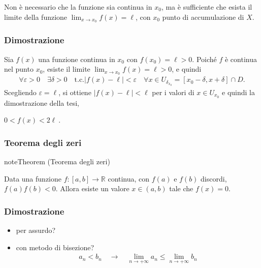\documentclass[letterpaper,10pt,italian]{jupyterBook}
\begin{document}
\sphinxAtStartPar
{} Non è necessario che la funzione sia continua in \(x_0\), ma è sufficiente che esista il limite della funzione \(\lim_{x \rightarrow x_0} f(x) = \ell\), con \(x_0\) punto di accumulazione di \(X\).
\subsubsection*{Dimostrazione}

\sphinxAtStartPar
Sia \(f(x)\) una funzione continua in \(x_0\) con \(f(x_0) = \ell > 0\). Poiché \(f\) è continua nel punto \(x_0\), esiste il limite \(\lim_{x \rightarrow x_0} f(x) = \ell > 0\), e quindi
\begin{equation*}
\begin{split}\forall \varepsilon > 0 \quad \exists \delta > 0 \quad \text{t.c.} |f(x) - \ell| < \varepsilon \quad \forall x \in U_{\delta_{x_0}} = [ x_0 - \delta, x + \delta] \cap D . \end{split}
\end{equation*}
\sphinxAtStartPar
Scegliendo \(\varepsilon = \ell\), si ottiene \(|f(x) - \ell| < \ell\) per i valori di \(x \in U_{x_0}\) e quindi la dimostrazione della tesi,

\sphinxAtStartPar
\(0 < f(x) < 2 \ell \ .\)


\subsubsection{Teorema degli zeri}
\label{\detokenize{ch/infinitesimal_calculus/analysis:teorema-degli-zeri}}\label{\detokenize{ch/infinitesimal_calculus/analysis:infinitesimal-calculus-continuous-fun-thms-zeros}}\label{None:thm:infinitesimal-calculus:continuous-fun:thms:zeros}
\begin{sphinxadmonition}{note}{Theorem  (Teorema degli zeri)}



\sphinxAtStartPar
Data una funzione \(f: [a,b] \rightarrow \mathbb{R}\) continua, con \(f(a)\) e \(f(b)\) discordi, \(f(a) f(b) < 0\). Allora esiste un valore \(x \in (a,b)\) tale che \(f(x) = 0\).
\end{sphinxadmonition}
\subsubsection*{Dimostrazione}

\sphinxAtStartPar
{}
\begin{itemize}
\item {} 
\sphinxAtStartPar
per assurdo?

\item {} 
\sphinxAtStartPar
con metodo di bisezione? 
\begin{equation*}
\begin{split}a_n < b_n \quad \rightarrow \quad \lim_{n \rightarrow +\infty} a_n \le \lim_{n \rightarrow +\infty} b_n\end{split}
\end{equation*}
\end{itemize}
\end{document}
